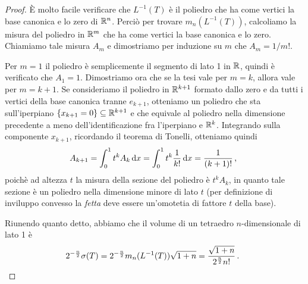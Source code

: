 \begin{proof}
	È molto facile verificare che $L^{-1}(T)$ è il poliedro che ha come vertici la base canonica e lo zero di $\mathbb R^n$. Perciò per trovare $m_n(L^{-1}(T))$, calcoliamo la misura del poliedro in $\mathbb R^m$ che ha come vertici la base canonica e lo zero. Chiamiamo tale misura $A_m$ e dimostriamo per induzione su $m$ che $A_m=1/m!$.
	
	Per $m=1$ il poliedro è semplicemente il segmento di lato 1 in $\mathbb R$, quindi è verificato che $A_1=1$. Dimostriamo ora che se la tesi vale per $m=k$, allora vale per $m=k+1$. Se consideriamo il poliedro in $\mathbb R^{k+1}$ formato dallo zero e da tutti i vertici della base canonica tranne $e_{k+1}$, otteniamo un poliedro che sta sull'iperpiano $\{x_{k+1}=0\}\subseteq\mathbb R^{k+1}$ e che equivale al poliedro nella dimensione precedente a meno dell'identificazione fra l'iperpiano e $\mathbb R^k$. 
	Integrando sulla componente $x_{k+1}$, ricordando il teorema di Tonelli, otteniamo quindi
	\begin{equation*}
		A_{k+1}=\int_0^1t^kA_k\,\mathrm d x=\int_0^1t^k\frac 1{k!}\,\mathrm d x=\frac 1{(k+1)!}\, \text{, }
	\end{equation*}
	poichè ad altezza $t$ la misura della sezione del poliedro è $t^kA_k$, in quanto tale sezione è un poliedro nella dimensione minore di lato $t$ (per definizione di inviluppo convesso la \emph{fetta} deve essere un'omotetia di fattore $t$ della base).
	
	Riunendo quanto detto, abbiamo che il volume di un tetraedro $n$-dimensionale di lato 1 è
	\begin{equation*}
		2^{-\frac n2}\sigma(T)=2^{-\frac n2}m_n(L^{-1}(T))\sqrt{1+n}=\frac{\sqrt{1+n}}{2^{\frac n2}n!}\, \text{. }		
	\end{equation*}
		
\end{proof}


